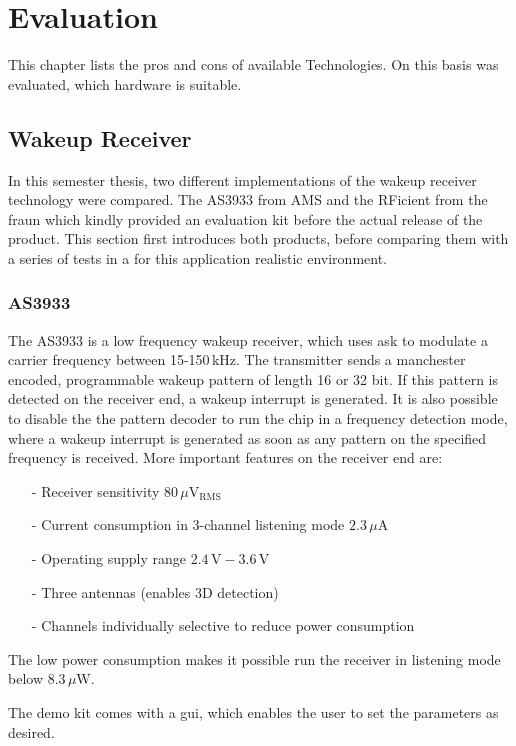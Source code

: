 \chapter{Evaluation}
This chapter lists the pros and cons of available Technologies.
On this basis was evaluated, which hardware is suitable.

\section{Wakeup Receiver}
In this semester thesis, two different implementations of the wakeup receiver technology were compared.
The AS3933 from AMS and the RFicient from the \acf{fraun} which kindly provided an evaluation kit before the actual release of the product.
This section first introduces both products, before comparing them with a series of tests in a for this application realistic environment.

\subsection{AS3933}
The AS3933 is a low frequency wakeup receiver, which uses \acs{ask} to modulate a carrier frequency between 15-150\,kHz.
The transmitter sends a manchester encoded, programmable wakeup pattern of length 16 or 32 bit.
If this pattern is detected on the receiver end, a wakeup interrupt is generated.
It is also possible to disable the the pattern decoder to run the chip in a frequency detection mode, where a wakeup interrupt is generated as soon as any pattern on the specified frequency is received.
More important features on the receiver end are:
\begin{itemize}
	\item[-] Receiver sensitivity $80\,\mu\text{V$_{\text{RMS}}$}$
	\item[-] Current consumption in 3-channel listening mode $2.3\,\mu\text{A}$
	\item[-] Operating supply range $2.4\,\text{V}-3.6\,\text{V}$
	\item[-] Three antennas (enables 3D detection)
	\item[-] Channels  individually selective to reduce power consumption
\end{itemize}
The low power consumption makes it possible run the receiver in listening mode below $8.3\,\mu\text{W}$\cite{as3933}.

The demo kit comes with a \acs{gui}, which enables the user to set the parameters as desired.

